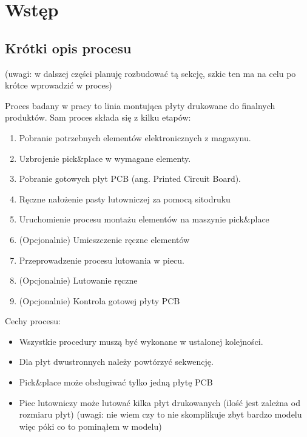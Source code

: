 \chapter{Wstęp}

\section{Krótki opis procesu}
(uwagi: w dalszej części planuję rozbudować tą sekcję, szkic ten ma na celu po krótce wprowadzić w proces)

Proces badany w pracy to linia montująca płyty drukowane do finalnych produktów.
Sam proces składa się z kilku etapów:
\begin{enumerate}
	\item Pobranie potrzebnych elementów elektronicznych z magazynu.
	\item Uzbrojenie pick\&place w wymagane elementy.
	\item Pobranie gotowych płyt PCB (ang. Printed Circuit Board).
	\item Ręczne nałożenie pasty lutowniczej za pomocą sitodruku
	\item Uruchomienie procesu montażu elementów na maszynie pick\&place
	\item (Opcjonalnie) Umieszczenie ręczne elementów
	\item Przeprowadzenie procesu lutowania w piecu.
	\item (Opcjonalnie) Lutowanie ręczne
	\item (Opcjonalnie) Kontrola gotowej płyty PCB
\end{enumerate}

Cechy procesu:
\begin{itemize}
	\item Wszystkie procedury muszą być wykonane w ustalonej kolejności.
	\item Dla płyt dwustronnych należy powtórzyć sekwencję.
	\item Pick\&place może obsługiwać tylko jedną płytę PCB
	\item Piec lutowniczy może lutować kilka płyt drukowanych (ilość jest zależna od rozmiaru płyt)
	      (uwagi: nie wiem czy to nie skomplikuje zbyt bardzo modelu więc póki co to pominąłem w modelu)
\end{itemize}

